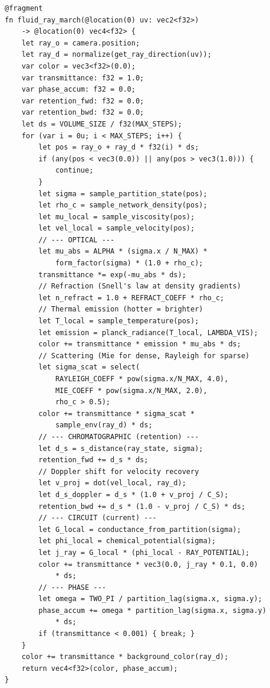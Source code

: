 \begin{lstlisting}[style=wgsl,caption={Pass 3: Fluid Ray March (WGSL)}]
@fragment
fn fluid_ray_march(@location(0) uv: vec2<f32>)
    -> @location(0) vec4<f32> {
    let ray_o = camera.position;
    let ray_d = normalize(get_ray_direction(uv));
    var color = vec3<f32>(0.0);
    var transmittance: f32 = 1.0;
    var phase_accum: f32 = 0.0;
    var retention_fwd: f32 = 0.0;
    var retention_bwd: f32 = 0.0;
    let ds = VOLUME_SIZE / f32(MAX_STEPS);
    for (var i = 0u; i < MAX_STEPS; i++) {
        let pos = ray_o + ray_d * f32(i) * ds;
        if (any(pos < vec3(0.0)) || any(pos > vec3(1.0))) {
            continue;
        }
        let sigma = sample_partition_state(pos);
        let rho_c = sample_network_density(pos);
        let mu_local = sample_viscosity(pos);
        let vel_local = sample_velocity(pos);
        // --- OPTICAL ---
        let mu_abs = ALPHA * (sigma.x / N_MAX) *
            form_factor(sigma) * (1.0 + rho_c);
        transmittance *= exp(-mu_abs * ds);
        // Refraction (Snell's law at density gradients)
        let n_refract = 1.0 + REFRACT_COEFF * rho_c;
        // Thermal emission (hotter = brighter)
        let T_local = sample_temperature(pos);
        let emission = planck_radiance(T_local, LAMBDA_VIS);
        color += transmittance * emission * mu_abs * ds;
        // Scattering (Mie for dense, Rayleigh for sparse)
        let sigma_scat = select(
            RAYLEIGH_COEFF * pow(sigma.x/N_MAX, 4.0),
            MIE_COEFF * pow(sigma.x/N_MAX, 2.0),
            rho_c > 0.5);
        color += transmittance * sigma_scat *
            sample_env(ray_d) * ds;
        // --- CHROMATOGRAPHIC (retention) ---
        let d_s = s_distance(ray_state, sigma);
        retention_fwd += d_s * ds;
        // Doppler shift for velocity recovery
        let v_proj = dot(vel_local, ray_d);
        let d_s_doppler = d_s * (1.0 + v_proj / C_S);
        retention_bwd += d_s * (1.0 - v_proj / C_S) * ds;
        // --- CIRCUIT (current) ---
        let G_local = conductance_from_partition(sigma);
        let phi_local = chemical_potential(sigma);
        let j_ray = G_local * (phi_local - RAY_POTENTIAL);
        color += transmittance * vec3(0.0, j_ray * 0.1, 0.0)
            * ds;
        // --- PHASE ---
        let omega = TWO_PI / partition_lag(sigma.x, sigma.y);
        phase_accum += omega * partition_lag(sigma.x, sigma.y)
            * ds;
        if (transmittance < 0.001) { break; }
    }
    color += transmittance * background_color(ray_d);
    return vec4<f32>(color, phase_accum);
}
\end{lstlisting}

